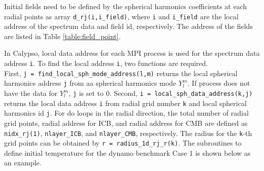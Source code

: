 Initial fields need to be defined by the spherical harmonics coefficients at each radial points as array \verb|d_rj(i,i_field)|, where \verb|i| and \verb|i_field| are the local address of the spectrum data and field id, respectively. The address of the fields are listed in Table \ref{table:field_point}.

In Calypso, local data address for each MPI process is used for the spectrum data address \verb|i|. To find the local address \verb|i|, two functions are required. \\
First, \verb|j = find_local_sph_mode_address(l,m)| returns the local spherical  harmonics address \verb|j| from aa spherical harmonics mode $Y_{l}^{m}$. If process does not have the data for $Y_{l}^{m}$, \verb|j| is set to 0. Second, \verb|i = local_sph_data_address(k,j)| returns the local data address \verb|i| from radial grid number \verb|k| and local spherical harmonics id \verb|j|. For do loops in the radial direction, the total number of radial grid points, radial address for ICB, and radial address for CMB are defined as \verb|nidx_rj(1)|, \verb|nlayer_ICB|, and \verb|nlayer_CMB|, respectively. The radius for the \verb|k|-th grid points can be obtained by \verb|r = radius_1d_rj_r(k)|. The subroutines to define initial temperature for the dynamo benchmark Case 1 is shown below as an example.

